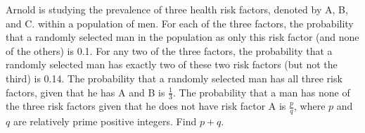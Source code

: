Arnold is studying the prevalence of three health risk factors, denoted by A, B, and C. within a population of men. For each of the three factors, the probability that a randomly selected man in the population as only this risk factor (and none of the others) is 0.1. For any two of the three factors, the probability that a randomly selected man has exactly two of these two risk factors (but not the third) is 0.14. The probability that a randomly selected man has all three risk factors, given that he has A and B is $\tfrac{1}{3}$. The probability that a man has none of the three risk factors given that he does not have risk factor A is $\tfrac{p}{q}$, where $p$ and $q$ are relatively prime positive integers. Find $p+q$.